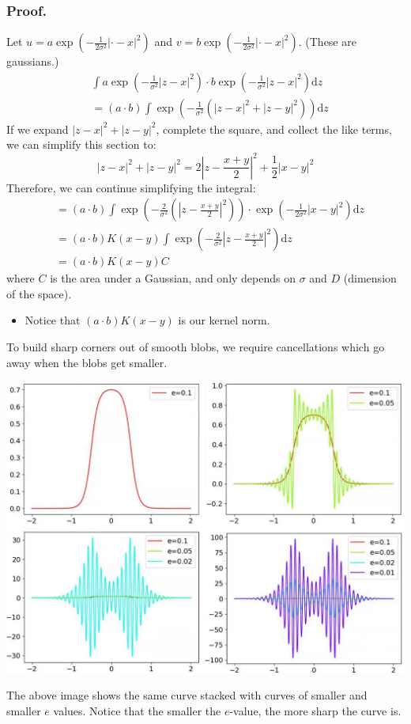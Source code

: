 \documentclass[10pt]{article}
\begin{document}
\subsubsection*{Proof.}
Let $u = a \exp(-\frac{1}{2\sigma^2} | \cdot - x |^2)$ and $v = b\exp(-\frac{1}{2\sigma^2} |\cdot - x|^2)$.  (These are gaussians.)
\begin{align*}
    &\int a \exp \left(-\frac{1}{\sigma^2}|z - x|^2\right) \cdot b\exp\left(-\frac{1}{\sigma^2}|z - x|^2\right) \text{d}z\\
    &= (a \cdot b) \int \exp \left(-\frac{1}{\sigma^2}(|z - x|^2 + |z - y|^2)\right) \text{d}z
\end{align*}
If we expand $|z - x|^2 + |z - y|^2$, complete the square, and collect the like terms, we can simplify this section to:
\[|z - x|^2 + |z - y|^2 = 2|z - \frac{x + y}{2}|^2 + \frac{1}{2}|x - y|^2\]
Therefore, we can continue simplifying the integral:
\begin{align*}
    &= (a \cdot b) \int \exp \left(-\frac{2}{\sigma^2}(|z - \frac{x + y}{2}|^2)\right) \cdot \exp\left(-\frac{1}{2\sigma^2}|x - y|^2\right) \text{d}z\\
    &= (a \cdot b) K(x - y) \int \exp \left( -\frac{2}{\sigma^2} |z - \frac{x + y}{2}|^2\right) \text{d}z\\
    &= (a \cdot b) K(x - y)C
\end{align*}
where $C$ is the area under a Gaussian, and only depends on $\sigma$ and $D$ (dimension of the space).
\begin{itemize}
    \item Notice that $(a \cdot b)K(x - y)$ is our kernel norm.
\end{itemize}
To build sharp corners out of smooth blobs, we require cancellations which go away when the blobs get smaller.
\begin{center}
    \includegraphics*[scale=0.4]{W3_9.png}
\end{center}
The above image shows the same curve stacked with curves of smaller and smaller $e$ values.  Notice that the smaller the $e$-value, the more sharp the curve is.
\end{document}
